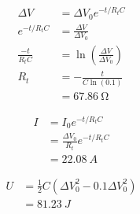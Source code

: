 \begin{reponsebox}
  \begin{align*}
    \Delta V &= \Delta V_0 e^{-t/R_tC}  \\
    e^{-t/R_tC} &= \frac{\Delta V}{\Delta V_0}  \\
    \frac{-t}{R_tC} &= \ln\left( \frac{\Delta V}{\Delta V_0} \right)  \\
    R_t &= -\frac{t}{C\ln\left( \num{0.1} \right)}  \\
        &= \SI{67.86}{\ohm}
  \end{align*}

  \begin{align*}
    I &= I_0 e^{-t/R_tC}  \\
      &= \frac{\Delta V_0}{R_t} e^{-t/R_tC}  \\
      &= \SI{22.08}{A}
  \end{align*}

  \begin{align*}
    U &= \frac{1}{2} C (\Delta V_0^2 - \num{0.1} \Delta V_0^2)  \\
      &= \SI{81.23}{J}
  \end{align*}
\end{reponsebox}
